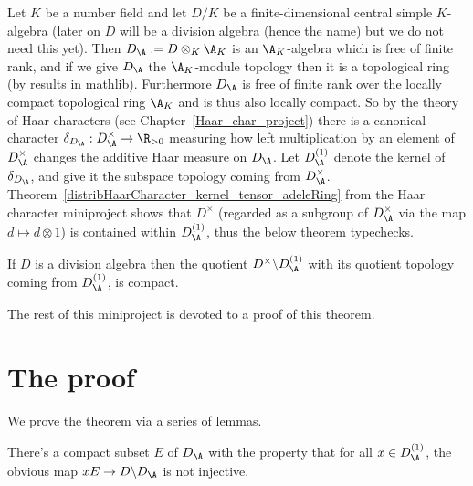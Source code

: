 Let $K$ be a number field and let $D/K$ be a finite-dimensional central simple $K$-algebra
(later on $D$ will be a division algebra (hence the name) but we do not need this yet).
Then $D_{\A}:=D\otimes_K\A_K$ is an $\A_K$-algebra which
is free of finite rank, and if we give $D_{\A}$ the $\A_K$-module topology then it is
a topological ring (by results in mathlib). Furthermore $D_{\A}$ is free of finite
rank over the locally compact topological ring $\A_K$ and is thus also
locally compact. So by the theory of Haar characters (see Chapter~\ref{Haar_char_project})
there is a canonical character $\delta_{D_{\A}}:D_{\A}^\times\to\R_{>0}$ measuring
how left multiplication by an element of $D_{\A}^\times$ changes the additive Haar
measure on $D_{\A}$. Let $D_{\A}^{(1)}$ denote the kernel of $\delta_{D_{\A}}$,
and give it the subspace topology coming from $D_{\A}^\times$.
Theorem~\ref{distribHaarCharacter_kernel_tensor_adeleRing} from the
Haar character miniproject shows that $D^\times$ (regarded as a subgroup of $D_{\A}^\times$
via the map $d\mapsto d\otimes 1$) is contained within $D_{\A}^{(1)}$,
thus the below theorem typechecks.

\begin{theorem}
  \label{NumberField.AdeleRing.DivisionAlgebra.compact_quotient} If $D$ is a division algebra then
  the quotient $D^\times\backslash D_{\A}^{(1)}$
  with its quotient topology coming from $D_{\A}^{(1)}$, is compact.
\end{theorem}

The rest of this miniproject is devoted to a proof of this theorem.

\section{The proof}

We prove the theorem via a series of lemmas.

\begin{lemma}
  \label{NumberField.AdeleRing.DivisionAlgebra.Aux.existsE}
  There's a compact subset $E$ of $D_{\A}$
  with the property that for all $x\in D_{\A}^{(1)}$,
  the obvious map $xE\to D\backslash D_{\A}$ is not injective.
\end{lemma}

